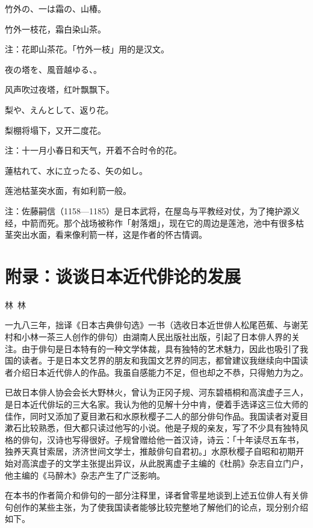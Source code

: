 \begin{haiku}
    {\FH 竹外の、一は霜の、山椿。}

    {\FK 竹外一枝花，霜白染山茶。}

    {\FT 注：花即山茶花。「竹外一枝」用的是汉文。}
\end{haiku}

\begin{haiku}
    {\FH 夜の塔を、風音越ゆる、。}

    {\FK 风声吹过夜塔，红叶飘飘下。}
\end{haiku}

\begin{haiku}
    {\FH 梨や、えんとして、返り花。}

    {\FK 梨棚将塌下，又开二度花。}

    {\FT 注：十一月小春日和天气，开着不合时令的花。}
\end{haiku}

\begin{haiku}
    {\FH 蓮枯れて、水に立ったる、矢の如し。}

    {\FK 莲池枯茎突水面，有如利箭一般。}

    {\FT 注：佐藤嗣信（1158—1185）是日本武将，在屋岛与平教经对仗，为了掩护源义经，中箭而死。那个战场被称作「射落畑」，现在它的周边是莲池，池中有很多枯茎突出水面，看来像利箭一样，这是作者的怀古情调。}
\end{haiku}

\chapter{\FS 附录：谈谈日本近代俳论的发展}

 {\hfill \FS 林~林}

 {\FS
  一九八三年，拙译《日本古典俳句选》一书（选收日本近世俳人松尾芭蕉、与谢芜村和小林一茶三人创作的俳句）由湖南人民出版社出版，引起了日本俳人界的关注。由于俳句是日本特有的一种文学体裁，具有独特的艺术魅力，因此也吸引了我国的读者。于是日本文艺界的朋友和我国文艺界的同志，都曾建议我继续向中国读者介绍日本近代俳人的作品。我虽自感能力不足，但也却之不恭，只得勉力为之。

  已故日本俳人协会会长大野林火，曾认为正冈子规、河东碧梧桐和高滨虚子三人，是日本近代俳坛的三大名家。我认为他的见解十分中肯，便着手选译这三位大师的佳作，同时又添加了夏目漱石和水原秋樱子二人的部分俳句作品。我国读者对夏目漱石比较熟悉，但大都只读过他写的小说。他是子规的亲友，写了不少具有独特风格的俳句，汉诗也写得很好。子规曾赠给他一首汉诗，诗云：「十年读尽五车书，独养天真甘索居，济济世间文学士，推敲俳句自君初。」水原秋樱子自昭和初期开始对高滨虚子的文学主张提出异议，从此脱离虚子主编的《杜鹃》杂志自立门户，他主编的《马醉木》杂志产生了广泛影响。

  在本书的作者简介和俳句的一部分注释里，译者曾零星地谈到上述五位俳人有关俳句创作的某些主张，为了使我国读者能够比较完整地了解他们的论点，现分别介绍如下。
 }

